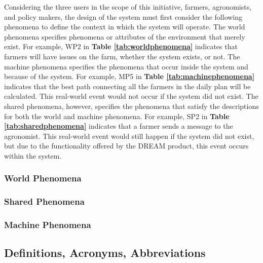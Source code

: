 \begin{flushleft} 
Considering the three users in the scope of this initiative, farmers, agronomists, and policy makers, the design of the system must first consider the following phenomena to define the context in which the system will operate. 
The world phenomena specifies phenomena or attributes of the environment that merely exist. For example, WP2 in \textbf{Table \ref{tab:worldphenomena}} indicates that farmers will have issues on the farm, whether the system exists, or not.
The machine phenomena specifies the phenomena that occur inside the system and because of the system. For example, MP5 in \textbf{Table \ref{tab:machinephenomena}} indicates that the best path connecting all the farmers in the daily plan will be calculated. This real-world event would not occur if the system did not exist. 
The shared phenomena, however, specifies the phenomena that satisfy the descriptions for both the world and machine phenomena. For example, SP2 in \textbf{Table \ref{tab:sharedphenomena}} indicates that a farmer sends a message to the agronomist. This real-world event would still happen if the system did not exist, but due to the functionality offered by the DREAM product, this event occurs within the system. 
\end{flushleft}

\subsubsection{World Phenomena}


\subsubsection{Shared Phenomena}


\subsubsection{Machine Phenomena}


\subsection{Definitions, Acronyms, Abbreviations}

